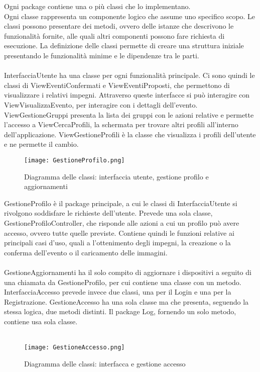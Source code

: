 Ogni package contiene una o più classi che lo implementano.\\
Ogni classe rappresenta un componente logico che assume uno specifico scopo.
Le classi possono presentare dei metodi, ovvero delle istanze che descrivono le funzionalità fornite,
alle quali altri componenti possono fare richiesta di esecuzione.
La definizione delle classi permette di creare una struttura iniziale
presentando le funzionalità minime e le dipendenze tra le parti.\\
\\
InterfacciaUtente ha una classe per ogni funzionalità principale.
Ci sono quindi le classi di ViewEventiConfermati e ViewEventiProposti,
che permettono di visualizzare i relativi impegni.
Attraverso queste interfacce si può interagire con ViewVisualizzaEvento,
per interagire con i dettagli dell'evento.
ViewGestioneGruppi presenta la lista dei gruppi con le azioni relative
e permette l'accesso a ViewCercaProfili,
la schermata per trovare altri profili all'interno dell'applicazione.
ViewGestioneProfili è la classe che visualizza i profili dell'utente e ne permette il cambio.\\

\begin{figure}[h!]
    \begin{center}
        \texttt{[image: GestioneProfilo.png]}
        \caption{Diagramma delle classi: interfaccia utente, gestione profilo e aggiornamenti}
    \end{center}
\end{figure}

GestioneProfilo è il package principale,
a cui le classi di InterfacciaUtente si rivolgono soddisfare le richieste dell'utente.
Prevede una sola classe, GestioneProfiloController,
che risponde alle azioni a cui un profilo può avere accesso, ovvero tutte quelle previste.
Contiene quindi le funzioni relative ai principali casi d'uso,
quali a l'ottenimento degli impegni, la creazione o la conferma dell'evento o il caricamento delle immagini.\\
\\
GestioneAggiornamenti ha il solo compito di aggiornare i dispositivi a seguito di una chiamata da GestioneProfilo,
per cui contiene una classe con un metodo.
InterfacciaAccesso prevede invece due classi, una per il Login e una per la Registrazione.
GestioneAccesso ha una sola classe ma che presenta, seguendo la stessa logica, due metodi distinti.
Il package Log, fornendo un solo metodo, contiene usa sola classe.\\
\\
\begin{figure}[h!]
    \begin{center}
        \texttt{[image: GestioneAccesso.png]}
        \caption{Diagramma delle classi: interfacca e gestione accesso}
    \end{center}
\end{figure}



\clearpage